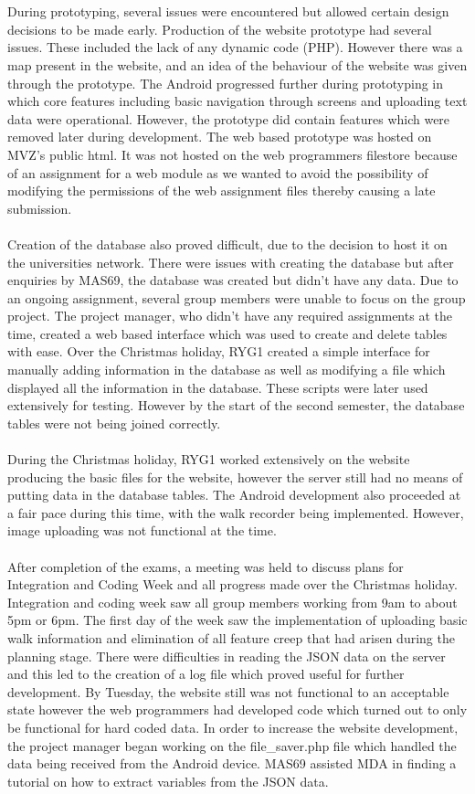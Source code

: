 \documentclass[12pt]{article}
\begin{document}
\\\\
During prototyping, several issues were encountered but allowed certain design decisions to be made early. Production of the website prototype had several issues. These included the lack of any dynamic code (PHP). However there was a map present in the website, and an idea of the behaviour of the website was given through the prototype. The Android progressed further during prototyping in which core features including basic navigation through screens and uploading text data were operational. However, the prototype did contain features which were removed later during development. The web based prototype was hosted on MVZ's public html. It was not hosted on the web programmers filestore because of an assignment for a web module as we wanted to avoid the possibility of modifying the permissions of the web assignment files thereby causing a late submission.
\\\\
Creation of the database also proved difficult, due to the decision to host it on the universities network. There were issues with creating the database but after enquiries by MAS69, the database was created but didn't have any data. Due to an ongoing assignment, several group members were unable to focus on the group project. The project manager, who didn't have any required assignments at the time, created a web based interface which was used to create and delete tables with ease. Over the Christmas holiday, RYG1 created a simple interface for manually adding information in the database as well as modifying a file which displayed all the information in the database. These scripts were later used extensively for testing. However by the start of the second semester, the database tables were not being joined correctly.
\\\\
During the Christmas holiday, RYG1 worked extensively on the website producing the basic files for the website, however the server still had no means of putting data in the database tables. The Android development also proceeded at a fair pace during this time, with the walk recorder being implemented. However, image uploading was not functional at the time. 
\\\\
After completion of the exams, a meeting was held to discuss plans for Integration and Coding Week and all progress made over the Christmas holiday. Integration and coding week saw all group members working from 9am to about 5pm or 6pm. The first day of the week saw the implementation of uploading basic walk information and elimination of all feature creep that had arisen during the planning stage. There were difficulties in reading the JSON data on the server and this led to the creation of a log file which proved useful for further development. By Tuesday, the website still was not functional to an acceptable state however the web programmers had developed code which turned out to only be functional for hard coded data. In order to increase the website development, the project manager began working on the file\_saver.php file which handled the data being received from the Android device. MAS69 assisted MDA in finding a tutorial on how to extract variables from the JSON data. 
\end{document}
